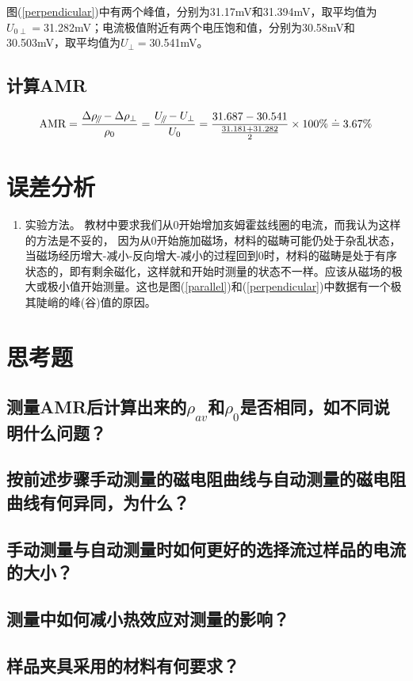 \documentclass[a4paper]{article}
\newcommand{\parallelsum}{\mathbin{\!/\mkern-5mu/\!}}
\begin{document}
图(\ref{perpendicular})中有两个峰值，分别为31.17mV和31.394mV，取平均值为$U_{0\perp}=$31.282mV；电流极值附近有两个电压饱和值，分别为30.58mV和30.503mV，取平均值为$U_{\perp}=$30.541mV。

\newpage
\subsection{计算AMR}
\begin{equation}
\text{AMR} = \frac{\Delta\rho_{\parallelsum} - \Delta\rho_{\perp}}{\rho_{0}} = \frac{U_{\parallelsum} - U_{\perp}}{U_{0}} = \frac{31.687 - 30.541}{\frac{31.181+31.282}{2}}\times 100\% \doteq 3.67\%\label{AMR}
\end{equation}

\section{误差分析}
\begin{enumerate}
	\item 实验方法。
	教材中要求我们从0开始增加亥姆霍兹线圈的电流，而我认为这样的方法是不妥的，%
	因为从0开始施加磁场，材料的磁畴可能仍处于杂乱状态，当磁场经历增大-减小-反向增大-减小的过程回到0时，材料的磁畴是处于有序状态的，即有剩余磁化，这样就和开始时测量的状态不一样。应该从磁场的极大或极小值开始测量。这也是图(\ref{parallel})和(\ref{perpendicular})中数据有一个极其陡峭的峰(谷)值的原因。

\end{enumerate}

\section{思考题}
\subsection{测量AMR后计算出来的$\rho_{av}$和$\rho_0$是否相同，如不同说明什么问题？}
\subsection{按前述步骤手动测量的磁电阻曲线与自动测量的磁电阻曲线有何异同，为什么？}
\subsection{手动测量与自动测量时如何更好的选择流过样品的电流的大小？}
\subsection{测量中如何减小热效应对测量的影响？}
\subsection{样品夹具采用的材料有何要求？}

\nocite{jiaocai}

\end{document}
